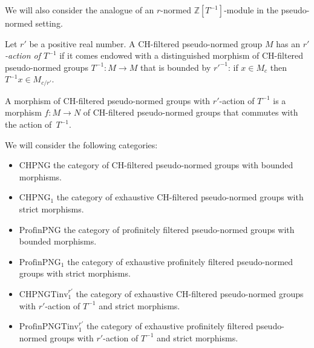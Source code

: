 We will also consider the analogue of an $r$-normed $\mathbb Z[T^{-1}]$-module in the pseudo-normed setting.

\begin{definition}
  \label{chpng-Tinv}
  \leanok
  Let $r'$ be a positive real number.
  A CH-filtered pseudo-normed group $M$
  has an \emph{$r'$-action of $T^{-1}$}
  if it comes endowed with a distinguished morphism of CH-filtered pseudo-normed groups
  $T^{-1} \colon M \to M$ that is bounded by $r'^{-1}$:
  if $x \in M_c$ then $T^{-1}x \in M_{c/r'}$.

  A morphism of CH-filtered pseudo-normed groups with $r'$-action of $T^{-1}$
  is a morphism $f \colon M \to N$ of CH-filtered pseudo-normed groups that commutes with the action of~$T^{-1}$.
\end{definition}

\begin{definition}
  \label{png-cats}
  We will consider the following categories:
  \begin{itemize}
    \item $\text{CHPNG}$ the category of CH-filtered pseudo-normed groups with bounded morphisms.
    \item $\text{CHPNG}_1$ the category of exhaustive CH-filtered pseudo-normed groups with strict morphisms.
    \item $\text{ProfinPNG}$ the category of profinitely filtered pseudo-normed groups with bounded morphisms.
    \item $\text{ProfinPNG}_1$ the category of exhaustive profinitely filtered pseudo-normed groups with strict morphisms.
    \item $\text{CHPNGTinv}_1^{r'}$ the category of exhaustive CH-filtered pseudo-normed groups with $r'$-action of $T^{-1}$ and strict morphisms.
    \item $\text{ProfinPNGTinv}_1^{r'}$ the category of exhaustive profinitely filtered pseudo-normed groups with $r'$-action of $T^{-1}$ and strict morphisms.
  \end{itemize}
\end{definition}

